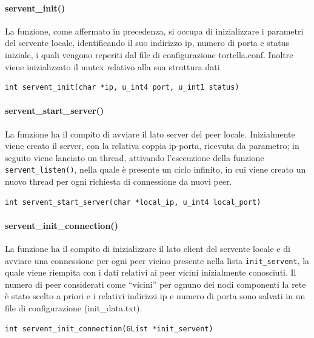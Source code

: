 \paragraph{servent\_init()}
La funzione, come affermato in precedenza, si occupa di inizializzare i parametri del servente locale, identificando  il suo indirizzo ip, numero di porta e status iniziale, i quali vengono reperiti dal file di configurazione tortella.conf. Inoltre viene inizializzato il mutex relativo alla sua struttura dati
\begin{lstlisting}
int servent_init(char *ip, u_int4 port, u_int1 status)
\end{lstlisting}
\paragraph{servent\_start\_server()}
La funzione ha il compito di avviare il lato server del peer locale. Inizialmente viene creato il server, con la relativa coppia ip-porta, ricevuta da parametro; in seguito viene lanciato un thread, attivando l'esecuzione della funzione \texttt{servent\_listen()}, nella quale è presente un ciclo infinito, in cui viene creato un nuovo thread per ogni richiesta di connessione da nuovi peer.
\begin{lstlisting}
int servent_start_server(char *local_ip, u_int4 local_port)
\end{lstlisting}
\paragraph{servent\_init\_connection()}
La funzione ha il compito di inizializzare il lato client del servente locale e di avviare una connessione per ogni peer vicino presente nella lista \texttt{init\_servent}, la quale viene riempita con i dati relativi ai peer vicini inizialmente conosciuti. Il numero di peer considerati come “vicini” per ognuno dei nodi componenti la rete è stato scelto a priori e i relativi indirizzi ip e numero di porta sono salvati in un file di configurazione (init\_data.txt). 
\begin{lstlisting}  
int servent_init_connection(GList *init_servent)
\end{lstlisting}

